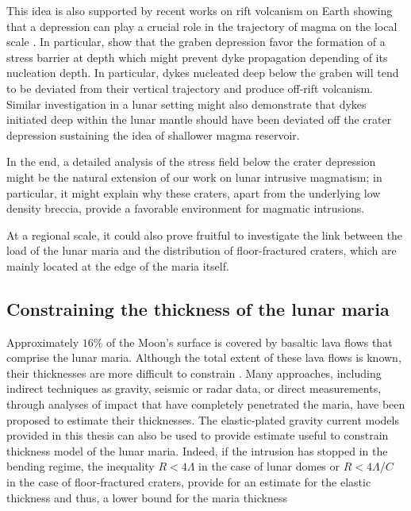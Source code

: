 This idea is also supported by recent works on rift volcanism on Earth
showing that a depression can play a crucial role in the trajectory of
magma  on the  local scale  \citep{Maccaferri:2014ft}. In  particular,
\citet{Maccaferri:2014ft} show  that the  graben depression  favor the
formation  of a  stress  barrier  at depth  which  might prevent  dyke
propagation depending  of its  nucleation depth. In  particular, dykes
nucleated deep  below the graben will  tend to be deviated  from their
vertical   trajectory  and   produce   off-rift  volcanism.    Similar
investigation in  a lunar  setting might  also demonstrate  that dykes
initiated deep within  the lunar mantle should have  been deviated off
the  crater   depression  sustaining  the  idea   of  shallower  magma
reservoir.

In the end,  a detailed analysis of the stress  field below the crater
depression  might  be the  natural  extension  of  our work  on  lunar
intrusive  magmatism;  in  particular,  it  might  explain  why  these
craters,  apart from  the underlying  low density breccia, provide  a
favorable environment for magmatic intrusions.

At a regional  scale, it could also prove fruitful  to investigate the
link  between the  load of  the lunar  maria and  the distribution  of
floor-fractured craters, which  are mainly located at the  edge of the
maria itself.
\subsection{Constraining the thickness of the lunar maria}
\label{sec:thickn-lunar-maria}

Approximately $16\%$ of the Moon's surface is covered by basaltic lava
flows  that comprise  the lunar  maria. Although  the total  extent of
these lava  flows is  known, their thicknesses  are more  difficult to
constrain \citep{Thomson:2009eo}. Many  approaches, including indirect
techniques as gravity, seismic or  radar data, or direct measurements,
through analyses of impact that  have completely penetrated the maria,
have been proposed to  estimate their thicknesses.  The elastic-plated
gravity current  models provided in  this thesis  can also be  used to
provide  estimate useful  to constrain  thickness model  of the  lunar
maria.  Indeed,  if the intrusion  has stopped in the  bending regime,
the  inequality  $R<   4\Lambda$  in  the  case  of   lunar  domes  or
$R<4\Lambda/C$ in the case of  floor-fractured craters, provide for an
estimate for  the elastic thickness  and thus,  a lower bound  for the
maria thickness

